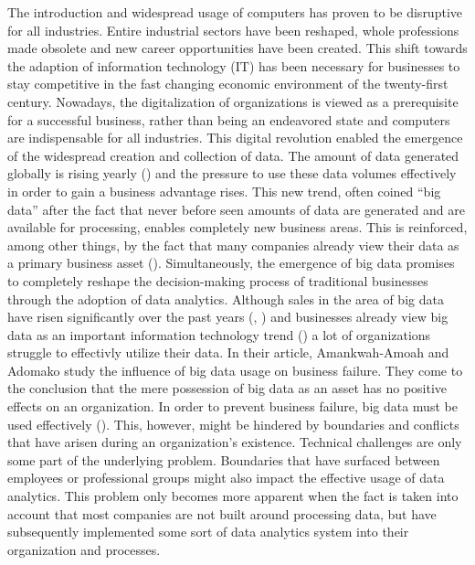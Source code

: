 The introduction and widespread usage of computers has proven to be disruptive for all industries. Entire industrial sectors have been reshaped, whole professions made obsolete and new career opportunities have been created. This shift towards the adaption of information technology (IT) has been necessary for businesses to stay competitive in the fast changing economic environment of the twenty-first century. Nowadays, the digitalization of organizations is viewed as a prerequisite for a successful business, rather than being an endeavored state and computers are indispensable for all industries. This digital revolution enabled the emergence of the widespread creation and collection of data. The amount of data generated globally is rising yearly (\cite{Seagate.2018}) and the pressure to use these data volumes effectively in order to gain a business advantage rises. 
This new trend, often coined \enquote{big data} after the fact that never before seen amounts of data are generated and are available for processing, enables completely new business areas. This is reinforced, among other things, by the fact that many companies already view their data as a primary business asset (\cite{Redman.2008}). Simultaneously, the emergence of big data promises to completely reshape the decision-making process of traditional businesses through the adoption of data analytics. Although sales in the area of big data have risen significantly over the past years (\cite{BISResearch.2018}, \cite{Bitkom.2018}) and businesses already view big data as an important information technology trend (\cite{Bitkom.2017}) a lot of organizations struggle to effectivly utilize their data. In their article, Amankwah-Amoah and Adomako study the influence of big data usage on business failure. 
They come to the conclusion that the mere possession of big data as an asset has no positive effects on an organization. In order to prevent business failure, big data must be used effectively  (\cite{AmankwahAmoah.2019}). This, however, might be hindered by boundaries and conflicts that have arisen during an organization's existence. Technical challenges are only some part of the underlying problem. Boundaries that have surfaced between employees or professional groups might also impact the effective usage of data analytics. This problem only becomes more apparent when the fact is taken into account that most companies are not built around processing data, but have subsequently implemented some sort of data analytics system into their organization and processes.

